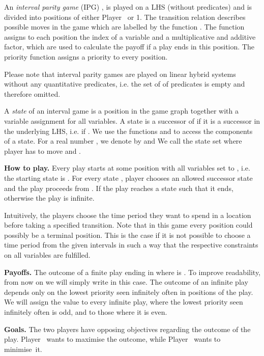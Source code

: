 \documentclass[fleqn,envcountsame]{LMCS}
\newcommand{\ie}{i.e.\xspace}
\newcommand{\pzero}{Player~\xspace}
\newcommand{\pone}{Player~\xspace}
\begin{document}
\begin{defi} \label{def-ipg}
An \emph{interval parity game} (IPG)
,
is played on a LHS  (without predicates) and
 is divided into positions of either \pzero or 1. 
The transition relation   describes possible
moves in the game which are labelled by the function
.
The function  assigns to each
position the index of a variable and a multiplicative and additive factor,
which are used to calculate the payoff if a play ends in this position.
The priority function 
assigns a priority to every position.
\end{defi}

Please note that interval parity games are played on linear hybrid systems without any quantitative predicates,
\ie the set of of predicates is empty and therefore omitted.

A \emph{state}  of an interval game
is a position in the game graph together with a variable assignment for
all  variables. 
A state  is a successor of  if it is a successor
in the underlying LHS, \ie if .
We use the functions  and  to 
access the components of a state.
For a real number , we denote by  and  
We call  the state set  where player 
has to move and .

\textbf{How to play.}
Every play starts at some position  with all variables set to ,
\ie the starting state is .
For every state , player 
chooses an allowed successor state  and the play
proceeds from . If the play reaches a state  such that
 it ends, otherwise the play is infinite.

Intuitively, the players choose the time period they want to spend
in a location before taking a specified transition.
Note that in this game every position could possibly be a terminal
position. This is the case if it is not possible to choose a time period
from the given intervals in such a way that the respective constraints
on all variables are fulfilled.

\textbf{Payoffs.}
The outcome  of a finite play ending in 
 where  is
.
To improve readability, from now on we will simply write 
 in this case.
The outcome of an infinite play depends only on the lowest priority seen
infinitely often in positions of the play. We will assign the value
 to every infinite play, where the lowest priority seen infinitely
often is odd, and  to those where it is even.


\textbf{Goals.}
The two players have opposing objectives regarding the outcome of the play.
\pzero wants to maximise the outcome, while \pone wants to minimise~it.
\end{document}
